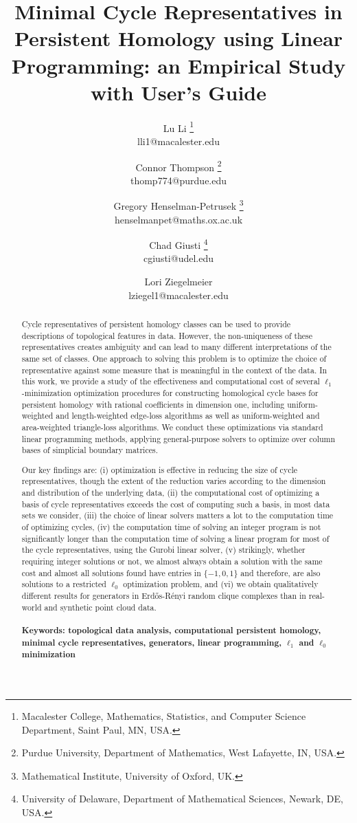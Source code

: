 \documentclass[11pt,onecolumn]{article}
\title{Minimal Cycle Representatives in Persistent Homology using Linear Programming: an Empirical Study with User’s Guide}
\author{Lu Li \thanks{Macalester College, Mathematics, Statistics, and Computer Science Department, Saint Paul, MN, USA.} \\ lli1@macalester.edu  \and Connor Thompson \thanks{Purdue University, Department of Mathematics, West Lafayette, IN, USA. } \\ thomp774@purdue.edu \and  Gregory Henselman-Petrusek \thanks{Mathematical Institute, University of Oxford, UK. } \\  henselmanpet@maths.ox.ac.uk \and  Chad Giusti \thanks{University of Delaware, Department of Mathematical Sciences, Newark, DE, USA. } \\ cgiusti@udel.edu \and  Lori Ziegelmeier \footnotemark[1] \\lziegel1@macalester.edu}
\date{}
\theoremstyle{plain}
\theoremstyle{definition}
\begin{document}
\maketitle

\begin{abstract}
Cycle representatives of persistent homology classes can be used to provide descriptions of topological features in data. However, the non-uniqueness of these representatives creates ambiguity and can lead to many different interpretations of the same set of classes. One approach to solving this problem is to optimize the choice of representative against some measure that is meaningful in the context of the data. In this work, we provide a study of the effectiveness and computational cost of several $\ell_1$-minimization optimization procedures for constructing homological cycle bases for persistent homology with rational coefficients in dimension one, including uniform-weighted and length-weighted edge-loss algorithms as well as uniform-weighted and area-weighted triangle-loss algorithms. We conduct these optimizations via standard linear programming methods, applying general-purpose solvers to optimize over column bases of simplicial boundary matrices. 

Our key findings are: 
(i) optimization is effective in reducing the size of cycle representatives, though the extent of the reduction varies according to the dimension and distribution of the underlying data, (ii) the computational cost of optimizing a basis of cycle representatives exceeds the cost of computing such a basis, in most data sets we consider, (iii) the choice of linear solvers matters a lot to the computation time of optimizing cycles, (iv) the computation time of solving an integer program is not significantly longer than the computation time of solving a linear program for most of the cycle representatives, using the Gurobi linear solver, (v) strikingly, whether requiring integer solutions or not, we almost always obtain a solution with the same cost and almost all solutions found have entries in $\{-1, 0, 1\}$ and therefore, are also solutions to a restricted $\ell_0$ optimization problem, and (vi) we obtain qualitatively different results for generators in Erd\H{o}s-Rényi random clique complexes than in real-world and synthetic point cloud data. 
\\\\
\small \textbf{ Keywords:  topological data analysis, computational persistent homology, minimal cycle representatives, generators, linear programming, $\ell_1$ and $\ell_0$ minimization}
\end{abstract}
\end{document}

